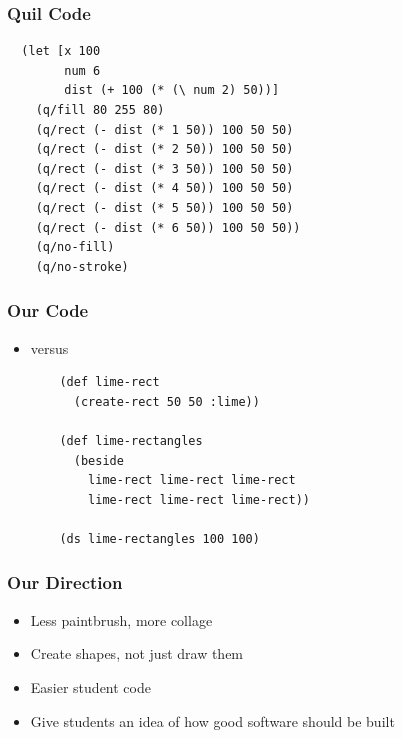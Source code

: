 \documentclass{beamer}
\begin{document}
\begin{frame}[fragile]
\frametitle{Quil Code}
		\begin{verbatim}
  (let [x 100
  		num 6
  		dist (+ 100 (* (\ num 2) 50))]
	(q/fill 80 255 80)
	(q/rect (- dist (* 1 50)) 100 50 50)
	(q/rect (- dist (* 2 50)) 100 50 50)
	(q/rect (- dist (* 3 50)) 100 50 50)
	(q/rect (- dist (* 4 50)) 100 50 50)
	(q/rect (- dist (* 5 50)) 100 50 50)
	(q/rect (- dist (* 6 50)) 100 50 50))
	(q/no-fill)
	(q/no-stroke)
		\end{verbatim}	

\end{frame}

\begin{frame}[fragile]
\frametitle{Our Code}
	\begin{itemize}
		\item versus
		\begin{verbatim}
	(def lime-rect 
	  (create-rect 50 50 :lime))
	  
	(def lime-rectangles 
	  (beside 
	    lime-rect lime-rect lime-rect 
	    lime-rect lime-rect lime-rect))
	  						  
	(ds lime-rectangles 100 100)
			\end{verbatim}
	\end{itemize}
\end{frame}

\begin{frame}
	\frametitle{Our Direction}
	\begin{itemize}
		\item Less paintbrush, more collage
		\item Create shapes, not just draw them
		\item Easier student code
		\item Give students an idea of how good software should be built              
	\end{itemize}
\end{frame}
\end{document}
